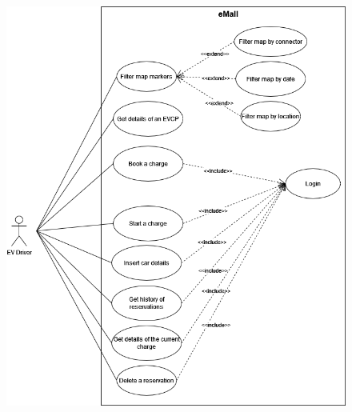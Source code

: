 \begin{figure}[H]
    \centering
    \includegraphics[scale=0.6]{src/use_case_diagram/driver.png}
\end{figure}


